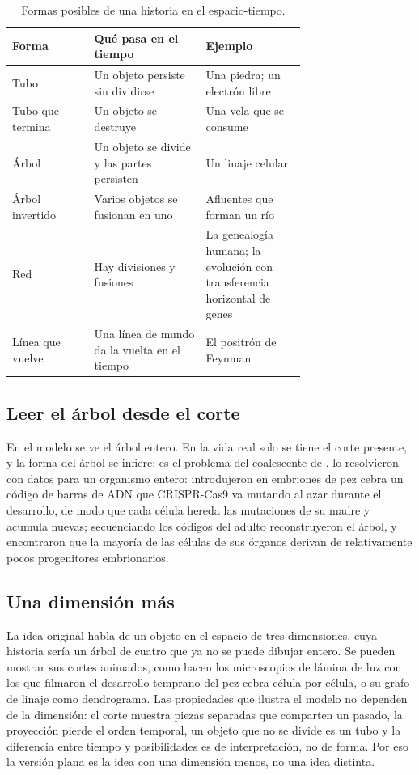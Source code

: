 \documentclass[11pt,a4paper]{article}
\begin{document}
\begin{table}[htbp]
\centering
\small
\caption{Formas posibles de una historia en el espacio-tiempo.}
\label{tab:formas}
\begin{tabular}{@{}lp{0.38\linewidth}p{0.34\linewidth}@{}}
\toprule
Forma & Qué pasa en el tiempo & Ejemplo \\
\midrule
Tubo & Un objeto persiste sin dividirse & Una piedra; un electrón libre \\
Tubo que termina & Un objeto se destruye & Una vela que se consume \\
Árbol & Un objeto se divide y las partes persisten & Un linaje celular \\
Árbol invertido & Varios objetos se fusionan en uno & Afluentes que forman un río \\
Red & Hay divisiones y fusiones & La genealogía humana; la evolución con transferencia horizontal de genes \\
Línea que vuelve & Una línea de mundo da la vuelta en el tiempo & El positrón de Feynman \\
\bottomrule
\end{tabular}
\end{table}

\subsection{Leer el árbol desde el corte}

En el modelo se ve el árbol entero. En la vida real solo se tiene el corte presente, y la forma del árbol se infiere: es el problema del coalescente de \textcite{kingman1982}. \textcite{mckenna2016} lo resolvieron con datos para un organismo entero: introdujeron en embriones de pez cebra un código de barras de ADN que CRISPR-Cas9 va mutando al azar durante el desarrollo, de modo que cada célula hereda las mutaciones de su madre y acumula nuevas; secuenciando los códigos del adulto reconstruyeron el árbol, y encontraron que la mayoría de las células de sus órganos derivan de relativamente pocos progenitores embrionarios.

\subsection{Una dimensión más}

La idea original habla de un objeto en el espacio de tres dimensiones, cuya historia sería un árbol de cuatro que ya no se puede dibujar entero. Se pueden mostrar sus cortes animados, como hacen los microscopios de lámina de luz con los que \textcite{keller2008} filmaron el desarrollo temprano del pez cebra célula por célula, o su grafo de linaje como dendrograma. Las propiedades que ilustra el modelo no dependen de la dimensión: el corte muestra piezas separadas que comparten un pasado, la proyección pierde el orden temporal, un objeto que no se divide es un tubo y la diferencia entre tiempo y posibilidades es de interpretación, no de forma. Por eso la versión plana es la idea con una dimensión menos, no una idea distinta.
\end{document}
